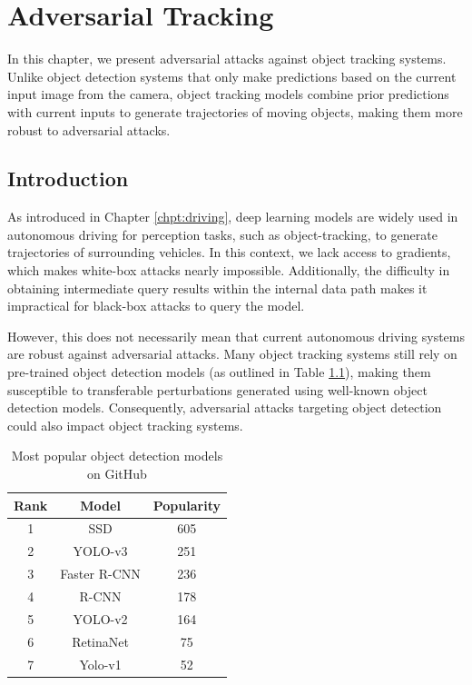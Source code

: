\chapter{Adversarial Tracking}
\label{chpt:tracking}


In this chapter, we present adversarial attacks against object tracking systems. Unlike object detection systems that only make predictions based on the current input image from the camera, object tracking models combine prior predictions with current inputs to generate trajectories of moving objects, making them more robust to adversarial attacks.

\section{Introduction}
\label{sec:adv_track}

As introduced in Chapter \ref{chpt:driving}, deep learning models are widely used in autonomous driving for perception tasks, such as object-tracking, to generate trajectories of surrounding vehicles. In this context, we lack access to gradients, which makes white-box attacks nearly impossible. Additionally, the difficulty in obtaining intermediate query results within the internal data path makes it impractical for black-box attacks to query the model.

However, this does not necessarily mean that current autonomous driving systems are robust against adversarial attacks. Many object tracking systems still rely on pre-trained object detection models (as outlined in Table \ref{tab.detection_github}), making them susceptible to transferable perturbations generated using well-known object detection models. Consequently, adversarial attacks targeting object detection could also impact object tracking systems.

\begin{table}[H]
\centering
\begin{tabular}{ ccc } 
\hline
Rank & Model & Popularity \\
\hline
1 & SSD & 605 \\ 
2 & YOLO-v3 & 251 \\ 
3 & Faster R-CNN & 236 \\ 
4 & R-CNN & 178 \\ 
5 & YOLO-v2 & 164 \\ 
6 & RetinaNet & 75 \\ 
7 & Yolo-v1 & 52 \\ 
\hline
\end{tabular}
\caption{Most popular object detection models on GitHub \citep{wang2021daedalus}}
\label{tab.detection_github}
\end{table}

